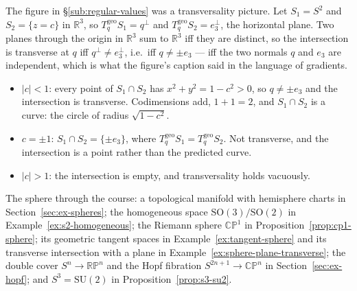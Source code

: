 \documentclass[11pt]{report}
\makeatletter
\newcounter{excounter}[section]
\newcommand{\exlabel}[1]{\edef\@currentlabel{\arabic{section}.\arabic{excounter}}\label{#1}}
\newcommand{\SO}{\mathrm{SO}}
\newcommand{\geo}{\mathrm{geo}}
\makeatother
\begin{document}
\begin{exbox}\exlabel{ex:sphere-plane-transverse}
The figure in \S\ref{sub:regular-values} was a transversality picture. Let $S_1 = S^2$ and $S_2 = \{z = c\}$ in $\mathbb{R}^3$, so $T^{\geo}_qS_1 = q^\perp$ and $T^{\geo}_qS_2 = e_3^\perp$, the horizontal plane. Two planes through the origin in $\mathbb{R}^3$ sum to $\mathbb{R}^3$ iff they are distinct, so the intersection is transverse at $q$ iff $q^\perp \neq e_3^\perp$, i.e.\ iff $q \neq \pm e_3$ --- iff the two normals $q$ and $e_3$ are independent, which is what the figure's caption said in the language of gradients.
\begin{itemize}
    \item $|c| < 1$: every point of $S_1 \cap S_2$ has $x^2 + y^2 = 1 - c^2 > 0$, so $q \neq \pm e_3$ and the intersection is transverse. Codimensions add, $1 + 1 = 2$, and $S_1 \cap S_2$ is a curve: the circle of radius $\sqrt{1-c^2}$.
    \item $c = \pm 1$: $S_1 \cap S_2 = \{\pm e_3\}$, where $T^{\geo}_qS_1 = T^{\geo}_qS_2$. Not transverse, and the intersection is a point rather than the predicted curve.
    \item $|c| > 1$: the intersection is empty, and transversality holds vacuously.
\end{itemize}
\end{exbox}

The sphere through the course: a topological manifold with hemisphere charts in Section~\ref{sec:ex-spheres}; the homogeneous space $\SO(3)/\SO(2)$ in Example~\ref{ex:s2-homogeneous}; the Riemann sphere $\mathbb{CP}^1$ in Proposition~\ref{prop:cp1-sphere}; its geometric tangent spaces in Example~\ref{ex:tangent-sphere} and its transverse intersection with a plane in Example~\ref{ex:sphere-plane-transverse}; the double cover $S^n \to \mathbb{RP}^n$ and the Hopf fibration $S^{2n+1} \to \mathbb{CP}^n$ in Section~\ref{sec:ex-hopf}; and $S^3 = \mathrm{SU}(2)$ in Proposition~\ref{prop:s3-su2}.
\end{document}
